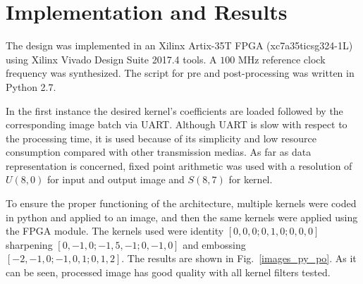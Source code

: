 \documentclass[conference,compsoc]{IEEEtran}
\begin{document}

\section{Implementation and Results}\label{sec:implementation}
The design was implemented in an Xilinx Artix-35T FPGA (xc7a35ticsg324-1L) using
Xilinx Vivado Design Suite 2017.4 tools. A $100$ MHz reference clock frequency
was synthesized. The script for pre and post-processing was written in Python
2.7.

In the first instance the desired kernel's coefficients are loaded followed by
the corresponding image batch via UART\@. Although UART is slow with respect to
the processing time, it is used because of its simplicity and low resource
consumption compared with other transmission medias.
As far as data representation is concerned, fixed point arithmetic was used with
a resolution of $U(8,0)$ for input and output image and $S(8,7)$ for kernel.

To ensure the proper functioning of the architecture, multiple kernels were
coded in python and applied to an image, and then the same kernels were applied
using the FPGA module. The kernels used were identity $[0, 0, 0; 0, 1, 0; 0, 0,
0]$ sharpening $[0, -1, 0; -1, 5, -1; 0, -1, 0]$ and embossing $[-2, -1, 0; -1,
0, 1; 0, 1, 2]$. The results are shown in Fig.~\ref{images_py_po}. As it can be
seen, processed image has good quality with all kernel filters tested.
\end{document}
